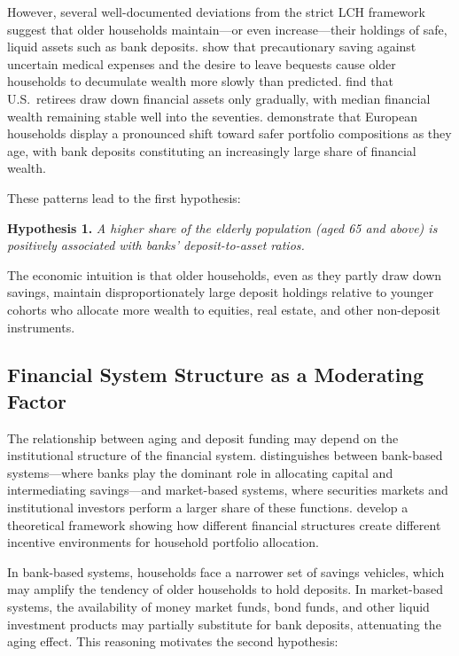 \documentclass[12pt,a4paper]{article}
\begin{document}
However, several well-documented deviations from the strict LCH framework suggest that older households maintain---or even increase---their holdings of safe, liquid assets such as bank deposits. \citet{DeNardi2010} show that precautionary saving against uncertain medical expenses and the desire to leave bequests cause older households to decumulate wealth more slowly than predicted. \citet{Poterba2011} find that U.S.\ retirees draw down financial assets only gradually, with median financial wealth remaining stable well into the seventies. \citet{Boersch-Supan2003} demonstrate that European households display a pronounced shift toward safer portfolio compositions as they age, with bank deposits constituting an increasingly large share of financial wealth.

These patterns lead to the first hypothesis:

\medskip
\noindent\textbf{Hypothesis 1.} \textit{A higher share of the elderly population (aged 65 and above) is positively associated with banks' deposit-to-asset ratios.}
\medskip

The economic intuition is that older households, even as they partly draw down savings, maintain disproportionately large deposit holdings relative to younger cohorts who allocate more wealth to equities, real estate, and other non-deposit instruments.

\subsection{Financial System Structure as a Moderating Factor}

The relationship between aging and deposit funding may depend on the institutional structure of the financial system. \citet{Levine2002} distinguishes between bank-based systems---where banks play the dominant role in allocating capital and intermediating savings---and market-based systems, where securities markets and institutional investors perform a larger share of these functions. \citet{Allen2000} develop a theoretical framework showing how different financial structures create different incentive environments for household portfolio allocation.

In bank-based systems, households face a narrower set of savings vehicles, which may amplify the tendency of older households to hold deposits. In market-based systems, the availability of money market funds, bond funds, and other liquid investment products may partially substitute for bank deposits, attenuating the aging effect. This reasoning motivates the second hypothesis:
\end{document}
